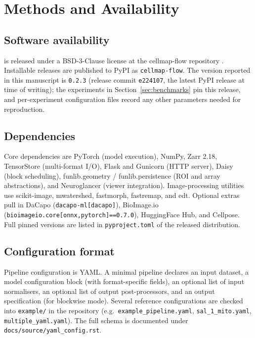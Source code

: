 \section{Methods and Availability}
\label{sec:methods}

\subsection*{Software availability}

\cellmapflow{} is released under a BSD-3-Clause license at the cellmap-flow repository \cite{CellMapFlowRepo}. Installable releases are published to PyPI as \texttt{cellmap-flow}. The version reported in this manuscript is \texttt{0.2.3} (release commit \texttt{e224107}, the latest PyPI release at time of writing); the experiments in Section~\ref{sec:benchmarks} pin this release, and per-experiment configuration files record any other parameters needed for reproduction.

\subsection*{Dependencies}

Core dependencies are PyTorch (model execution), NumPy, Zarr 2.18, TensorStore (multi-format I/O), Flask and Gunicorn (HTTP server), Daisy (block scheduling), funlib.geometry / funlib.persistence (ROI and array abstractions), and Neuroglancer (viewer integration). Image-processing utilities use scikit-image, mwatershed, fastmorph, fastremap, and edt. Optional extras pull in DaCapo (\texttt{dacapo-ml[dacapo]}), BioImage.io (\texttt{bioimageio.core[onnx,pytorch]==0.7.0}), HuggingFace Hub, and Cellpose. Full pinned versions are listed in \texttt{pyproject.toml} of the released distribution.

\subsection*{Configuration format}

Pipeline configuration is YAML. A minimal pipeline declares an input dataset, a model configuration block (with format-specific fields), an optional list of input normalisers, an optional list of output post-processors, and an output specification (for blockwise mode). Several reference configurations are checked into \texttt{example/} in the repository (e.g.\ \texttt{example\_pipeline.yaml}, \texttt{sal\_1\_mito.yaml}, \texttt{multiple\_yaml.yaml}). The full schema is documented under \texttt{docs/source/yaml\_config.rst}.


